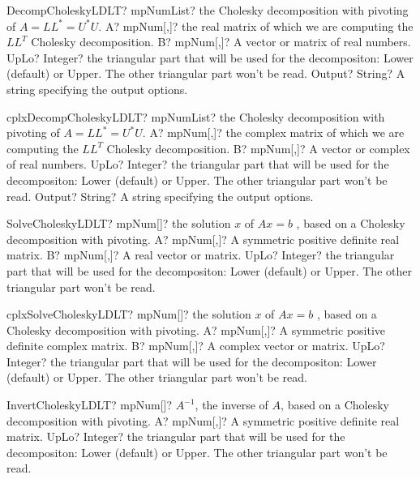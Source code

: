 \documentclass[12pt,a4paper,openany]{book}
\begin{document}
\begin{mpFunctionsExtract}
\mpFunctionFour
{DecompCholeskyLDLT? mpNumList? the Cholesky decomposition with pivoting of $A = LL^* = U^*U$.}
{A? mpNum[,]? the real matrix of which we are computing the $LL^T$ Cholesky decomposition.}
{B? mpNum[,]? A vector or matrix of real numbers.}
{UpLo? Integer? the triangular part that will be used for the decompositon: Lower (default) or Upper. The other triangular part won't be read.}
{Output? String? A string specifying the output options.}
\end{mpFunctionsExtract}

\begin{mpFunctionsExtract}
\mpFunctionFour
{cplxDecompCholeskyLDLT? mpNumList? the Cholesky decomposition with pivoting of $A = LL^* = U^*U$.}
{A? mpNum[,]? the complex matrix of which we are computing the $LL^T$ Cholesky decomposition.}
{B? mpNum[,]? A vector or complex of real numbers.}
{UpLo? Integer? the triangular part that will be used for the decompositon: Lower (default) or Upper. The other triangular part won't be read.}
{Output? String? A string specifying the output options.}
\end{mpFunctionsExtract}

\begin{mpFunctionsExtract}
\mpFunctionThree
{SolveCholeskyLDLT? mpNum[]? the solution $x$ of $A x = b$ , based on a Cholesky decomposition with pivoting.}
{A? mpNum[,]? A symmetric positive definite real matrix.}
{B? mpNum[,]? A real vector or matrix.}
{UpLo? Integer? the triangular part that will be used for the decompositon: Lower (default) or Upper. The other triangular part won't be read.}
\end{mpFunctionsExtract}

\begin{mpFunctionsExtract}
\mpFunctionThree
{cplxSolveCholeskyLDLT? mpNum[]? the solution $x$ of $A x = b$ , based on a Cholesky decomposition with pivoting.}
{A? mpNum[,]? A symmetric positive definite complex matrix.}
{B? mpNum[,]? A complex vector or matrix.}
{UpLo? Integer? the triangular part that will be used for the decompositon: Lower (default) or Upper. The other triangular part won't be read.}
\end{mpFunctionsExtract}

\begin{mpFunctionsExtract}
\mpFunctionTwo
{InvertCholeskyLDLT? mpNum[]? $A^{-1}$, the inverse of $A$, based on a Cholesky decomposition with pivoting.}
{A? mpNum[,]? A symmetric positive definite real matrix.}
{UpLo? Integer? the triangular part that will be used for the decompositon: Lower (default) or Upper. The other triangular part won't be read.}
\end{mpFunctionsExtract}
\end{document}
